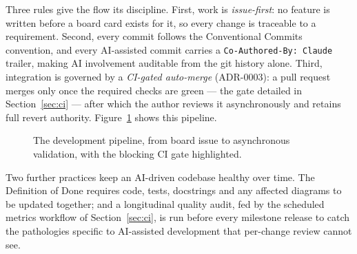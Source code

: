 Three rules give the flow its discipline. First, work is \emph{issue-first}: no
feature is written before a board card exists for it, so every change is traceable
to a requirement. Second, every commit follows the Conventional Commits convention,
and every AI-assisted commit carries a
\texttt{Co-Authored-By: Claude} trailer, making AI involvement auditable from the
git history alone. Third, integration is governed by a \emph{CI-gated auto-merge}
(ADR-0003): a pull request merges only once the required checks are green ---
the gate detailed in Section~\ref{sec:ci} --- after which the author reviews it
asynchronously and retains full revert authority. Figure~\ref{fig:pipeline} shows
this pipeline.

\begin{figure}[htbp]
\centering
{}
\caption[The continuous-integration development pipeline]{The development pipeline, from
board issue to asynchronous validation, with the blocking CI gate highlighted.}
\label{fig:pipeline}
\end{figure}

Two further practices keep an AI-driven codebase healthy over time. The Definition
of Done requires code, tests, docstrings and any affected diagrams to be updated
together; and a longitudinal quality audit, fed by the scheduled metrics workflow of
Section~\ref{sec:ci}, is run before every milestone release to catch the pathologies
specific to AI-assisted development that per-change review cannot see.

